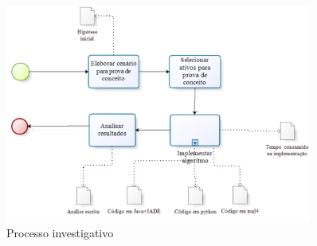 \begin{figure}[h!]
\centering
\label{f12}
\includegraphics[width=0.9\textwidth]{figuras/f09}
\caption{Processo investigativo }
\end{figure}
\FloatBarrier


